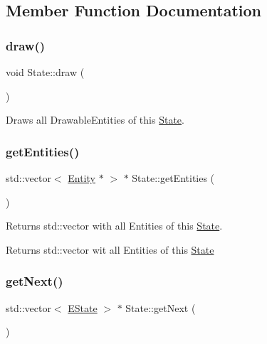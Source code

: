 \subsection{Member Function Documentation}
\mbox{\label{class_state_a548bbd450e95030e0582013466d71029}} 
\subsubsection{\texorpdfstring{draw()}{draw()}}
{\footnotesize\ttfamily void State\+::draw (\begin{DoxyParamCaption}{ }\end{DoxyParamCaption})}



Draws all Drawable\+Entities of this \mbox{\hyperlink{class_state}{State}}. 

\mbox{\label{class_state_aeb13f8cbb9aaac05ce2f48826ac4080e}} 
\subsubsection{\texorpdfstring{get\+Entities()}{getEntities()}}
{\footnotesize\ttfamily std\+::vector$<$ \mbox{\hyperlink{class_entity}{Entity}} $\ast$ $>$ $\ast$ State\+::get\+Entities (\begin{DoxyParamCaption}{ }\end{DoxyParamCaption})}



Returns std\+::vector with all Entities of this \mbox{\hyperlink{class_state}{State}}. 

\begin{DoxyReturn}{Returns}
std\+::vector wit all Entities of this \mbox{\hyperlink{class_state}{State}} 
\end{DoxyReturn}
\mbox{\label{class_state_a38819e230878dbaf8ef24014c539fe2c}} 
\subsubsection{\texorpdfstring{get\+Next()}{getNext()}}
{\footnotesize\ttfamily std\+::vector$<$ \mbox{\hyperlink{_finite_state_machine_8h_af5cd382b45a5ef41d63b95e55fbeca95}{E\+State}} $>$ $\ast$ State\+::get\+Next (\begin{DoxyParamCaption}{ }\end{DoxyParamCaption})}



